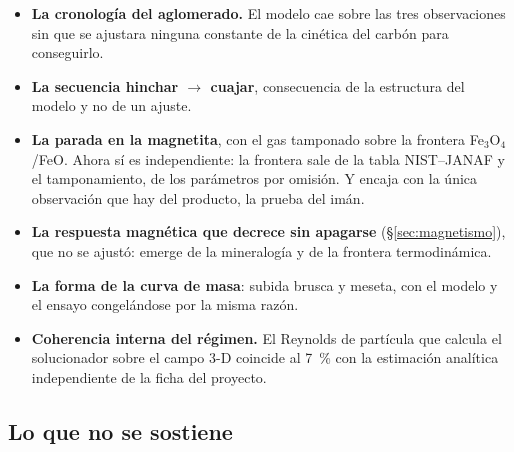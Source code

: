 \documentclass[11pt,a4paper]{article}
\begin{document}
\begin{itemize}[leftmargin=*,itemsep=2pt]
\item \textbf{La cronología del aglomerado.} El modelo cae sobre las tres
observaciones sin que se ajustara ninguna constante de la cinética del carbón
para conseguirlo.
\item \textbf{La secuencia hinchar $\rightarrow$ cuajar}, consecuencia de la
estructura del modelo y no de un ajuste.
\item \textbf{La parada en la magnetita}, con el gas tamponado sobre la
frontera Fe$_3$O$_4$/FeO. Ahora sí es independiente: la frontera sale de la
tabla NIST--JANAF y el tamponamiento, de los parámetros por omisión. Y encaja
con la única observación que hay del producto, la prueba del imán.
\item \textbf{La respuesta magnética que decrece sin apagarse}
(\S\ref{sec:magnetismo}), que no se ajustó: emerge de la mineralogía y de la
frontera termodinámica.
\item \textbf{La forma de la curva de masa}: subida brusca y meseta, con el
modelo y el ensayo congelándose por la misma razón.
\item \textbf{Coherencia interna del régimen.} El Reynolds de partícula que
calcula el solucionador sobre el campo 3-D coincide al \qty{7}{\percent} con la
estimación analítica independiente de la ficha del proyecto.
\end{itemize}

\subsection{Lo que no se sostiene}
\end{document}
